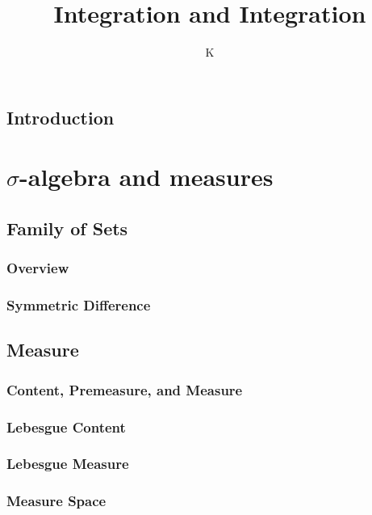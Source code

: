 \documentclass[a4paper]{book}
\title{Integration and Integration}
\author{K}
\theoremstyle{definition}
\begin{document}
\maketitle
\tableofcontents
\chapter*{Introduction}
%
\part{\(\sigma\)-algebra and measures}
%
\chapter{Family of Sets}
\section{Overview}

\section{Symmetric Difference}

%
%
\chapter{Measure}
\section{Content, Premeasure, and Measure}

\section{Lebesgue Content}

\section{Lebesgue Measure}

\section{Measure Space}

%
\end{document}

